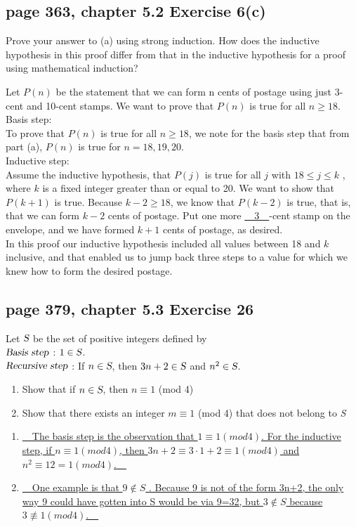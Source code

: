 \documentclass[sigconf]{acmart}
\begin{document}
\subsection{page 363, chapter 5.2 Exercise 6(c)}
\begin{shaded}
    Prove your answer to (a) using strong induction. How does the inductive hypothesis in this proof differ from that in the inductive hypothesis for a proof using mathematical induction?
\end{shaded}
Let $P(n)$ be the statement that we can form n cents of postage using just 3-cent and 10-cent stamps. We want to prove that $P(n)$ is true for all $n \geq 18$. \\
Basis step:\\ To prove that $P(n)$ is true for all $n \geq 18$, we note for the basis step that from part (a), $P(n)$ is true for $n = 18, 19, 20$. \\
Inductive step:\\ Assume the inductive hypothesis, that $P(j)$ is true for all $j$ with $18 \leq j \leq k$ , where $k$ is a fixed integer greater than or equal to 20. We want to show that $P(k + 1)$ is true. Because $k - 2 \geq 18$, we know that $P(k - 2)$ is true, that is, that we can form $k - 2$ cents of postage. Put one more \uline{~~3~~}-cent stamp on the envelope, and we have formed $k + 1$ cents of postage, as desired.\\
In this proof our inductive hypothesis included all values between 18 and $k$ inclusive, and that enabled us to jump back three steps to a value for which we knew how to form the desired postage.

\subsection{page 379, chapter 5.3 Exercise 26}
\begin{shaded}
    Let $\textsl{S}$ be the set of positive integers defined by\\
    $\textsl{Basis step}$ : $1 \in \textsl{S}$.\\
    $\textsl{Recursive step}$ : If $n \in \textsl{S}$, then $3n + 2 \in \textsl{S}$ and $n^2 \in \textsl{S}$.
     \begin{enumerate}[label=(\alph*)]
        \item Show that if $n \in \textsl{S}$, then $n \equiv 1$ (mod 4)
        \item Show that there exists an integer $m \equiv 1$ (mod 4) that does not belong to \textsl{S}
    \end{enumerate}
\end{shaded}
\begin{enumerate}[label=(\alph*)]
    \item \uline{~~The basis step is the observation that $1 \equiv 1(mod4)$. For the inductive step, if $n \equiv 1(mod4)$, then $3n+2 \equiv 3 \cdot 1+2 \equiv 1(mod4)$ and $n^2 \equiv 12 = 1(mod4)$.~~}
    \item \uline{~~One example is that $9 \notin S$ . Because 9 is not of the form 3n+2, the only way 9 could have gotten into S would be via 9=32, but $3 \notin S$ because $3 \not\equiv 1(mod4)$.~~}
\end{enumerate}

\vspace{15cm}
\end{document}

